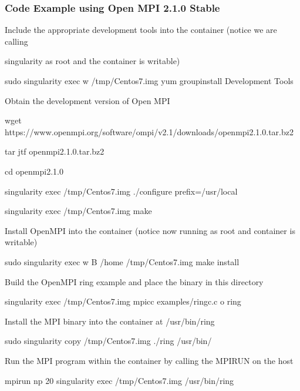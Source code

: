 \documentclass[letterpaper,10pt,english]{sphinxmanual}
\begin{document}
\subsubsection{Code Example using Open MPI 2.1.0 Stable}
\label{\detokenize{installation_environments:code-example-using-open-mpi-2-1-0-stable}}
%
\begin{sphinxVerbatim}[commandchars=\\\{\}]
\PYGZdl{} \PYGZsh{} Include the appropriate development tools into the container (notice we are calling

\PYGZdl{} \PYGZsh{} singularity as root and the container is writable)

\PYGZdl{} sudo singularity exec \PYGZhy{}w /tmp/Centos\PYGZhy{}7.img yum groupinstall \PYGZdq{}Development Tools\PYGZdq{}

\PYGZdl{}

\PYGZdl{} \PYGZsh{} Obtain the development version of Open MPI

\PYGZdl{} wget https://www.open\PYGZhy{}mpi.org/software/ompi/v2.1/downloads/openmpi\PYGZhy{}2.1.0.tar.bz2

\PYGZdl{} tar jtf openmpi\PYGZhy{}2.1.0.tar.bz2

\PYGZdl{} cd openmpi\PYGZhy{}2.1.0

\PYGZdl{}

\PYGZdl{} singularity exec /tmp/Centos\PYGZhy{}7.img ./configure \PYGZhy{}\PYGZhy{}prefix=/usr/local

\PYGZdl{} singularity exec /tmp/Centos\PYGZhy{}7.img make

\PYGZdl{}

\PYGZdl{} \PYGZsh{} Install OpenMPI into the container (notice now running as root and container is writable)

\PYGZdl{} sudo singularity exec \PYGZhy{}w \PYGZhy{}B /home /tmp/Centos\PYGZhy{}7.img make install

\PYGZdl{}

\PYGZdl{} \PYGZsh{} Build the OpenMPI ring example and place the binary in this directory

\PYGZdl{} singularity exec /tmp/Centos\PYGZhy{}7.img mpicc examples/ring\PYGZus{}c.c \PYGZhy{}o ring

\PYGZdl{}

\PYGZdl{} \PYGZsh{} Install the MPI binary into the container at /usr/bin/ring

\PYGZdl{} sudo singularity copy /tmp/Centos\PYGZhy{}7.img ./ring /usr/bin/

\PYGZdl{}

\PYGZdl{} \PYGZsh{} Run the MPI program within the container by calling the MPIRUN on the host

\PYGZdl{} mpirun \PYGZhy{}np 20 singularity exec /tmp/Centos\PYGZhy{}7.img /usr/bin/ring
\end{sphinxVerbatim}
\end{document}
